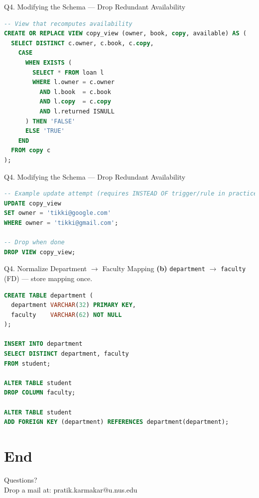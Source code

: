 \documentclass{beamer}
\begin{document}
\begin{frame}[fragile]{Q4. Modifying the Schema — Drop Redundant Availability}
\begin{lstlisting}[language=SQL]
-- View that recomputes availability
CREATE OR REPLACE VIEW copy_view (owner, book, copy, available) AS (
  SELECT DISTINCT c.owner, c.book, c.copy,
    CASE
      WHEN EXISTS (
        SELECT * FROM loan l
        WHERE l.owner = c.owner
          AND l.book  = c.book
          AND l.copy  = c.copy
          AND l.returned ISNULL
      ) THEN 'FALSE'
      ELSE 'TRUE'
    END
  FROM copy c
);
\end{lstlisting}
\end{frame}
\begin{frame}[fragile]{Q4. Modifying the Schema — Drop Redundant Availability}
\begin{lstlisting}[language=SQL]
-- Example update attempt (requires INSTEAD OF trigger/rule in practice)
UPDATE copy_view
SET owner = 'tikki@google.com'
WHERE owner = 'tikki@gmail.com';

-- Drop when done
DROP VIEW copy_view;
\end{lstlisting}
\end{frame}

\begin{frame}[fragile]{Q4. Normalize Department \texorpdfstring{$\to$}{->} Faculty Mapping}
\textbf{(b)} \texttt{department} $\to$ \texttt{faculty} (FD) — store mapping once.
\begin{lstlisting}[language=SQL]
CREATE TABLE department (
  department VARCHAR(32) PRIMARY KEY,
  faculty    VARCHAR(62) NOT NULL
);

INSERT INTO department
SELECT DISTINCT department, faculty
FROM student;

ALTER TABLE student
DROP COLUMN faculty;

ALTER TABLE student
ADD FOREIGN KEY (department) REFERENCES department(department);
\end{lstlisting}
\end{frame}

\section*{End}
\begin{frame}
\begin{center}
Questions?\\
Drop a mail at: pratik.karmakar@u.nus.edu
\end{center}
\end{frame}
\end{document}
